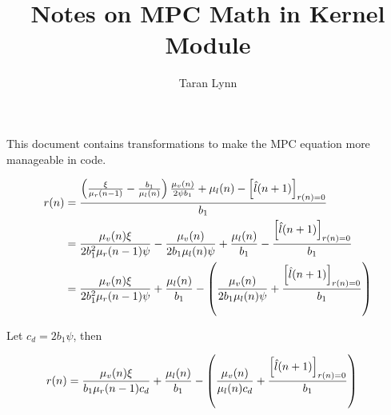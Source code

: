\documentclass[12pt]{article}
\title{Notes on MPC Math in Kernel Module}
\author{Taran Lynn}
\begin{document}
\maketitle

This document contains transformations to make the MPC equation more manageable
in code.

\begin{align*}
    r(n) &= \frac{\del{\frac{\xi}{\mu_r(n - 1)} - \frac{b_1}{\mu_l(n)}} \frac{\mu_v(n)}{2\psi b_1}
    + \mu_l(n) - \sbr{\hat{l}(n + 1)}_{r(n) = 0}}{b_1}\\
    &= \frac{\mu_v(n) \xi}{2b_1^2 \mu_r(n - 1) \psi} - \frac{\mu_v(n)}{2b_1 \mu_l(n) \psi}
    + \frac{\mu_l(n)}{b_1} - \frac{\sbr{\hat{l}(n + 1)}_{r(n) = 0}}{b_1}\\
    &= \frac{\mu_v(n) \xi}{2b_1^2 \mu_r(n - 1) \psi}
    + \frac{\mu_l(n)}{b_1} - \del{\frac{\mu_v(n)}{2b_1 \mu_l(n) \psi}
    + \frac{\sbr{\hat{l}(n + 1)}_{r(n) = 0}}{b_1}}
\end{align*}

Let $c_d = 2b_1 \psi$, then

\begin{align*}
    r(n) &= \frac{\mu_v(n) \xi}{b_1 \mu_r(n - 1) c_d}
    + \frac{\mu_l(n)}{b_1} - \del{\frac{\mu_v(n)}{\mu_l(n) c_d}
    + \frac{\sbr{\hat{l}(n + 1)}_{r(n) = 0}}{b_1}}
\end{align*}
\end{document}

